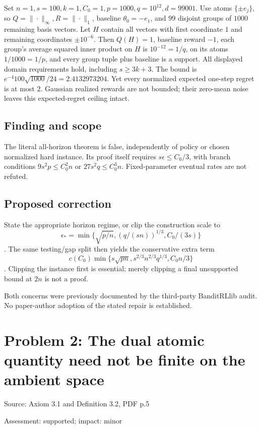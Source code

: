 \documentclass[11pt]{article}
\begin{document}
Set \(n=1,s=100,k=1,C_0=1,p=1000,q=10^{12},d=99001\). Use atoms \(\{\pm e_j\}\), so \(Q=\|\cdot\|_\infty,R=\|\cdot\|_1\), baseline \(\theta_0=-e_1\), and \(99\) disjoint groups of \(1000\) remaining basis vectors. Let \(H\) contain all vectors with first coordinate \(1\) and remaining coordinates \(\pm10^{-6}\). Then \(Q(H)=1\), baseline reward \(-1\), each group’s average squared inner product on \(H\) is \(10^{-12}=1/q\), on its atoms \(1/1000=1/p\), and every group tuple plus baseline is a support. All displayed domain requirements hold, including \(s\ge3k+3\). The bound is \(e^{-4}100\sqrt{1000}/24=2.4132973204\). Yet every normalized expected one-step regret is at most \(2\). Gaussian realized rewards are not bounded; their zero-mean noise leaves this expected-regret ceiling intact.

\subsection*{Finding and scope}

The literal all-horizon theorem is false, independently of policy or chosen normalized hard instance. Its proof itself requires \(s\epsilon\le C_0/3\), with branch conditions \(9s^2p\le C_0^2n\) or \(27s^2q\le C_0^3n\). Fixed-parameter eventual rates are not refuted.

\subsection*{Proposed correction}

State the appropriate horizon regime, or clip the construction scale to \[\epsilon_*=\min\{\sqrt{p/n},(q/(sn))^{1/3},C_0/(3s)\}\]. The same testing/gap split then yields the conservative extra term \[c(C_0)\min\{s\sqrt{pn},s^{2/3}n^{2/3}q^{1/3},C_0n/3\}\]. Clipping the instance first is essential; merely clipping a final unsupported bound at \(2n\) is not a proof.

Both concerns were previously documented by the third-party BanditRLlib audit. No paper-author adoption of the stated repair is established.

\section*{Problem 2: The dual atomic quantity need not be finite on the ambient space}

Source: Axiom 3.1 and Definition 3.2, PDF p.5

Assessment: supported; impact: minor
\end{document}
